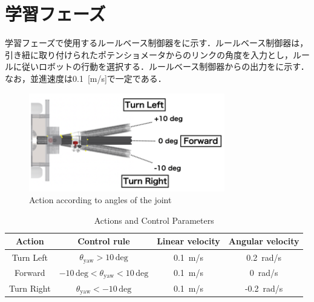 
\section{学習フェーズ}

  学習フェーズで使用するルールベース制御器をに示す．ルールベース制御器は，引き紐に取り付けられたポテンショメータからのリンクの角度を入力とし，ルールに従いロボットの行動を選択する．ルールベース制御器からの出力をに示す．なお，並進速度は0.1 \,[m/s]で一定である．

  \begin{figure}[h]
    \centering
    \includegraphics[keepaspectratio, scale=0.70] {images/okada_rule-based_contoroller.png}
    \caption{Action according to angles of the joint \cite{okada}}
    \label{Fig:okada_rule-based_contoroller}
  \end{figure}

  \begin{table}[ht]
    \caption{Actions and Control Parameters}
    \label{tab:actions_control_parameters}
    \centering
    \begin{tabular}{|c|c|c|c|}
    \hline
    \textbf{Action} & \textbf{Control rule} & \textbf{Linear velocity} & \textbf{Angular velocity} \\ 
    \hline
    Turn Left & $\theta_{\mathrm{yaw}} > 10 \, \mathrm{deg}$ & 0.1 \,m/s & 0.2 \,rad/s \\ 
    \hline
    Forward & $-10 \, \mathrm{deg} < \theta_{\mathrm{yaw}} < 10 \, \mathrm{deg}$ & 0.1 \,m/s & 0 \,rad/s \\ 
    \hline
    Turn Right & $\theta_{\mathrm{yaw}} < -10 \, \mathrm{deg}$ & 0.1 \,m/s & -0.2 \,rad/s \\ 
    \hline
    \end{tabular}
    \end{table}
  
\newpage